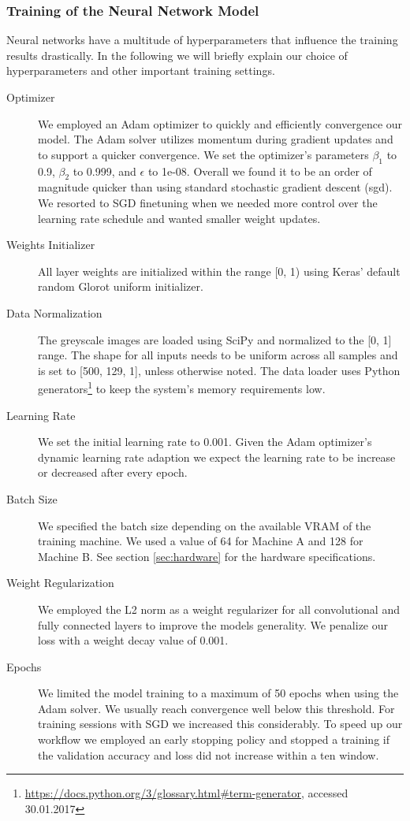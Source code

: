 \subsubsection{Training of the Neural Network Model} 
\label{sec:training}
Neural networks have a multitude of hyperparameters that influence the training results drastically. In the following we will briefly explain our choice of hyperparameters and other important training settings.

	\begin{description}
	\item[Optimizer] We employed an Adam\cite{kingma2014adam} optimizer to quickly and efficiently convergence our model. The Adam solver utilizes momentum during gradient updates and to support a quicker convergence. We set the optimizer's parameters $\beta_1$ to 0.9, $\beta_2$ to 0.999, and $\epsilon$ to 1e-08. Overall we found it to be an order of magnitude quicker than using standard stochastic gradient descent (\ac{sgd}). We resorted to SGD finetuning when we needed more control over the learning rate schedule and wanted smaller weight updates.
	\item[Weights Initializer] All layer weights are initialized within the range [0, 1) using Keras' default random Glorot uniform initializer\cite{glorot2010understanding}.
	\item[Data Normalization] The greyscale images are loaded using SciPy and normalized to the [0, 1] range. The shape for all inputs needs to be uniform across all samples and is set to [500, 129, 1], unless otherwise noted. The data loader uses Python generators\footnote{\url{https://docs.python.org/3/glossary.html#term-generator}, accessed 30.01.2017} to keep the system's memory requirements low.
	\item[Learning Rate] We set the initial learning rate to 0.001. Given the Adam optimizer's dynamic learning rate adaption we expect the learning rate to be increase or decreased after every epoch. 
	\item[Batch Size] We specified the batch size depending on the available VRAM of the training machine. We used a value of 64 for Machine A and 128 for Machine B. See section \ref{sec:hardware} for the hardware specifications. 
	\item[Weight Regularization] We employed the L2 norm as a weight regularizer for all convolutional and fully connected layers to improve the models generality. We penalize our loss with a weight decay value of 0.001. 
	\item[Epochs] We limited the model training to a maximum of 50 epochs when using the Adam solver. We usually reach convergence well below this threshold. For training sessions with SGD we increased this considerably. To speed up our workflow we employed an early stopping policy and stopped a training if the validation accuracy and loss did not increase within a ten window.

\end{description}
